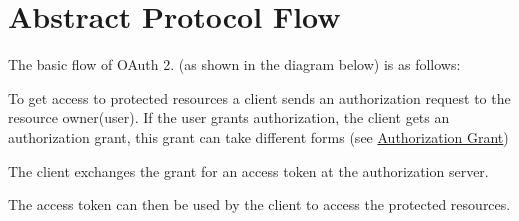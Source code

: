 \hypertarget{oauth_flow}{}\section{\-Abstract Protocol Flow}\label{oauth_flow}
\-The basic flow of \-O\-Auth 2. (as shown in the diagram below) is as follows\-:

\-To get access to protected resources a client sends an authorization request to the resource owner(user). \-If the user grants authorization, the client gets an authorization grant, this grant can take different forms (see \hyperlink{oauth_grant}{\-Authorization \-Grant}) \par
 \-The client exchanges the grant for an access token at the authorization server. \par
 \-The access token can then be used by the client to access the protected resources.

